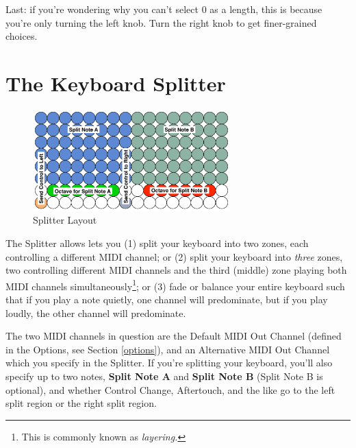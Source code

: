 \documentclass{article}
\begin{document}
Last: if you're wondering why you can't select 0 as a length, this is because you're only turning the left knob.  Turn the right knob to get finer-grained choices.


\clearpage

\section {The Keyboard Splitter}
\label{splitter}

\begin{figure}
\vspace{-1.5em}\includegraphics[width=3in]{split}
\vspace{-2em}\caption{\small Splitter Layout}
\label{splitter}
\end{figure}

The Splitter allows lets you (1) split your keyboard into two zones, each controlling a different MIDI channel; or (2) split your keyboard into {\it three} zones, two controlling different MIDI channels and the third (middle) zone playing both MIDI channels simultaneously\footnote{This is commonly known as {\it layering.}}; or (3) fade or balance your entire keyboard such that if you play a note quietly, one channel will predominate, but if you play loudly, the other channel will predominate.

The two MIDI channels in question are the Default MIDI Out Channel (defined in the Options, see Section \ref{options}), and an Alternative MIDI Out Channel which you specify in the Splitter.  If you're splitting your keyboard, you'll also specify up to two notes, {\bf Split Note A} and {\bf Split Note B}  (Split Note B is optional), and whether Control Change, Aftertouch, and the like go to the left split region or the right split region.
\end{document}
